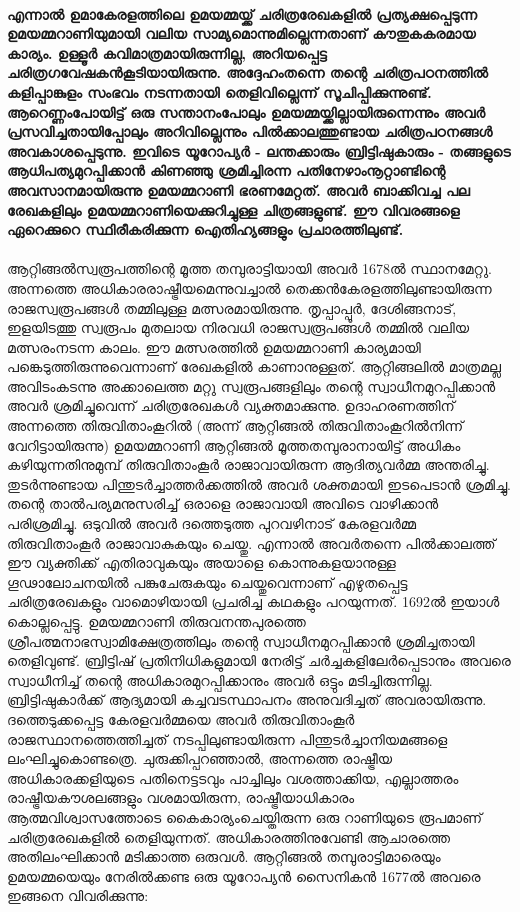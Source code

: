 \paragraph{എന്നാൽ ഉമാകേരളത്തിലെ ഉമയമ്മയ്ക്ക് ചരിത്രരേഖകളിൽ പ്രത്യക്ഷപ്പെടുന്ന ഉമയമ്മറാണിയുമായി വലിയ സാമ്യമൊന്നുമില്ലെന്നതാണ് കൗതുകകരമായ കാര്യം. ഉള്ളൂർ കവിമാത്രമായിരുന്നില്ല, അറിയപ്പെട്ട ചരിത്രഗവേഷകൻകൂടിയായിരുന്നു. അദ്ദേഹംതന്നെ തന്റെ ചരിത്രപഠനത്തിൽ കളിപ്പാങ്കുളം സംഭവം നടന്നതായി തെളിവില്ലെന്ന് സൂചിപ്പിക്കുന്നുണ്ട്. ആറെണ്ണംപോയിട്ട് ഒരു സന്താനംപോലും ഉമയമ്മയ്ക്കില്ലായിരുന്നെന്നും അവർ പ്രസവിച്ചതായിപ്പോലും അറിവില്ലെന്നും പിൽക്കാലത്തുണ്ടായ ചരിത്രപഠനങ്ങൾ അവകാശപ്പെടുന്നു. ഇവിടെ യൂറോപ്യർ - ലന്തക്കാരും ബ്രിട്ടിഷുകാരും - തങ്ങളുടെ ആധിപത്യമുറപ്പിക്കാൻ കിണഞ്ഞു ശ്രമിച്ചിരന്ന പതിനേഴാംനൂറ്റാണ്ടിന്റെ അവസാനമായിരുന്നു ഉമയമ്മറാണി ഭരണമേറ്റത്. അവർ ബാക്കിവച്ച പല രേഖകളിലും ഉമയമ്മറാണിയെക്കുറിച്ചുള്ള ചിത്രങ്ങളുണ്ട്. ഈ വിവരങ്ങളെ ഏറെക്കുറെ സ്ഥിരീകരിക്കുന്ന ഐതിഹ്യങ്ങളും പ്രചാരത്തിലുണ്ട്.
}

\paragraph{}ആറ്റിങ്ങൽസ്വരൂപത്തിന്റെ മൂത്ത തമ്പുരാട്ടിയായി അവർ 1678ൽ സ്ഥാനമേറ്റു. അന്നത്തെ അധികാരരാഷ്ട്രീയമെന്നുവച്ചാൽ തെക്കൻകേരളത്തിലുണ്ടായിരുന്ന രാജസ്വരൂപങ്ങൾ തമ്മിലുള്ള മത്സരമായിരുന്നു. തൃപ്പാപ്പൂർ, ദേശിങ്ങനാട്, ഇളയിടത്തു സ്വരൂപം മുതലായ നിരവധി രാജസ്വരൂപങ്ങൾ തമ്മിൽ വലിയ മത്സരംനടന്ന കാലം. ഈ മത്സരത്തിൽ ഉമയമ്മറാണി കാര്യമായി പങ്കെടുത്തിരുന്നുവെന്നാണ് രേഖകളിൽ കാണാനുള്ളത്. ആറ്റിങ്ങലിൽ മാത്രമല്ല അവിടംകടന്നു അക്കാലെത്ത മറ്റു സ്വരൂപങ്ങളിലും തന്റെ സ്വാധീനമുറപ്പിക്കാൻ അവർ ശ്രമിച്ചുവെന്ന് ചരിത്രരേഖകൾ വ്യക്തമാക്കുന്നു. ഉദാഹരണത്തിന് അന്നത്തെ തിരുവിതാംകൂറിൽ (അന്ന് ആറ്റിങ്ങൽ തിരുവിതാംകൂറിൽനിന്ന് വേറിട്ടായിരുന്നു) ഉമയമ്മറാണി ആറ്റിങ്ങൽ മൂത്തതമ്പുരാനായിട്ട് അധികം കഴിയുന്നതിനുമുമ്പ് തിരുവിതാംകൂർ രാജാവായിരുന്ന ആദിത്യവർമ്മ അന്തരിച്ചു. തുടർന്നുണ്ടായ പിന്തുടർച്ചാത്തർക്കത്തിൽ അവർ ശക്തമായി ഇടപെടാൻ ശ്രമിച്ചു. തന്റെ താൽപര്യമനുസരിച്ച് ഒരാളെ രാജാവായി അവിടെ വാഴിക്കാൻ പരിശ്രമിച്ചു. ഒടുവിൽ അവർ ദത്തെടുത്ത പുറവഴിനാട് കേരളവർമ്മ തിരുവിതാംകൂർ രാജാവാകുകയും ചെയ്തു. എന്നാൽ അവർതന്നെ പിൽക്കാലത്ത് ഈ വ്യക്തിക്ക് എതിരാവുകയും അയാളെ കൊന്നുകളയാനുള്ള ഗൂഢാലോചനയിൽ പങ്കുചേരുകയും ചെയ്തുവെന്നാണ് എഴുതപ്പെട്ട ചരിത്രരേഖകളും വാമൊഴിയായി പ്രചരിച്ച കഥകളും പറയുന്നത്. 1692ൽ ഇയാൾ കൊല്ലപ്പെട്ടു. ഉമയമ്മറാണി തിരുവനന്തപുരത്തെ ശ്രീപത്മനാഭസ്വാമിക്ഷേത്രത്തിലും തന്റെ സ്വാധീനമുറപ്പിക്കാൻ ശ്രമിച്ചതായി തെളിവുണ്ട്. ബ്രിട്ടിഷ് പ്രതിനിധികളുമായി നേരിട്ട് ചർച്ചകളിലേർപ്പെടാനും അവരെ സ്വാധീനിച്ച് തന്റെ അധികാരമുറപ്പിക്കാനും അവർ ഒട്ടും മടിച്ചിരുന്നില്ല. ബ്രിട്ടിഷുകാർക്ക് ആദ്യമായി കച്ചവടസ്ഥാപനം അനുവദിച്ചത് അവരായിരുന്നു. ദത്തെടുക്കപ്പെട്ട കേരളവർമ്മയെ അവർ തിരുവിതാംകൂർ രാജസ്ഥാനത്തെത്തിച്ചത് നടപ്പിലുണ്ടായിരുന്ന പിന്തുടർച്ചാനിയമങ്ങളെ ലംഘിച്ചുകൊണ്ടത്രെ. ചുരുക്കിപ്പറഞ്ഞാൽ, അന്നത്തെ രാഷ്ട്രീയ അധികാരക്കളിയുടെ പതിനെട്ടടവും പാച്ചിലും വശത്താക്കിയ, എല്ലാത്തരം രാഷ്ട്രീയകൗശലങ്ങളും വശമായിരുന്ന, രാഷ്ട്രീയാധികാരം ആത്മവിശ്വാസത്തോടെ കൈകാര്യംചെയ്തിരുന്ന ഒരു റാണിയുടെ രൂപമാണ് ചരിത്രരേഖകളിൽ തെളിയുന്നത്. അധികാരത്തിനുവേണ്ടി ആചാരത്തെ അതിലംഘിക്കാൻ മടിക്കാത്ത ഒരുവൾ. ആറ്റിങ്ങൽ തമ്പുരാട്ടിമാരെയും ഉമയമ്മയെയും നേരിൽക്കണ്ട ഒരു യൂറോപ്യൻ സൈനികൻ 1677ൽ അവരെ ഇങ്ങനെ വിവരിക്കുന്നു:

